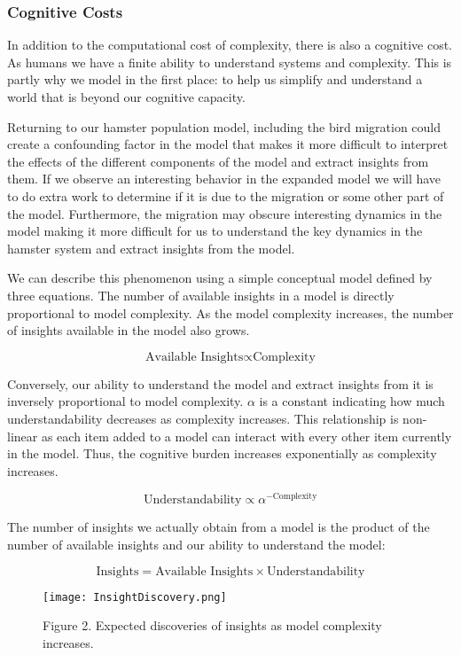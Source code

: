 \documentclass[]{memoir}
\let\Oldincludegraphics\includegraphics
\renewcommand{\includegraphics}[1]{\Oldincludegraphics[max size={\textwidth}{\textheight}]{#1}}
\begin{document}
\subsubsection{Cognitive Costs}

In addition to the computational cost of complexity, there is also a
cognitive cost. As humans we have a finite ability to understand systems
and complexity. This is partly why we model in the first place: to help
us simplify and understand a world that is beyond our cognitive
capacity.

Returning to our hamster population model, including the bird migration
could create a confounding factor in the model that makes it more
difficult to interpret the effects of the different components of the
model and extract insights from them. If we observe an interesting
behavior in the expanded model we will have to do extra work to
determine if it is due to the migration or some other part of the model.
Furthermore, the migration may obscure interesting dynamics in the model
making it more difficult for us to understand the key dynamics in the
hamster system and extract insights from the model.

We can describe this phenomenon using a simple conceptual model defined
by three equations. The number of available insights in a model is
directly proportional to model complexity. As the model complexity
increases, the number of insights available in the model also grows.

\[ \text{Available Insights} \propto \text{Complexity} \]

Conversely, our ability to understand the model and extract insights
from it is inversely proportional to model complexity. $\alpha$ is a
constant indicating how much understandability decreases as complexity
increases. This relationship is non-linear as each item added to a model
can interact with every other item currently in the model. Thus, the
cognitive burden increases exponentially as complexity increases.

\[ \text{Understandability} \propto \alpha^{-\text{Complexity}} \]

The number of insights we actually obtain from a model is the product of
the number of available insights and our ability to understand the
model:

\[ \text{Insights} = \text{Available Insights} \times \text{Understandability} \]

\begin{figure}[htbp]
\centering
\texttt{[image: InsightDiscovery.png]}
\caption{Figure 2. Expected discoveries of insights as model complexity
increases.}
\end{figure}
\end{document}
